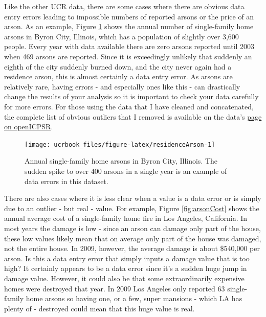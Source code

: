 \documentclass[
  12pt,
  openany]{book}
\begin{document}
Like the other UCR data, there are some cases where there are obvious data entry errors leading to impossible numbers of reported arsons or the price of an arson. As an example, Figure \ref{fig:residenceArson} shows the annual number of single-family home arsons in Byron City, Illinois, which has a population of slightly over 3,600 people. Every year with data available there are zero arsons reported until 2003 when 469 arsons are reported. Since it is exceedingly unlikely that suddenly an eighth of the city suddenly burned down, and the city never again had a residence arson, this is almost certainly a data entry error. As arsons are relatively rare, having errors - and especially ones like this - can drastically change the results of your analysis so it is important to check your data carefully for more errors. For those using the data that I have cleaned and concatenated, the complete list of obvious outliers that I removed is available on the data's \href{https://www.openicpsr.org/openicpsr/project/103540/version/V9/view}{page on openICPSR}.

\begin{figure}

{\centering \texttt{[image: ucrbook\_files/figure-latex/residenceArson-1]} 

}

\caption{Annual single-family home arsons in Byron  City, Illinois. The sudden spike to over 400 arsons in a single year is an example of data errors in this dataset. }\label{fig:residenceArson}
\end{figure}

There are also cases where it is less clear when a value is a data error or is simply due to an outlier - but real - value. For example, Figure \ref{fig:arsonCost} shows the annual average cost of a single-family home fire in Los Angeles, California. In most years the damage is low - since an arson can damage only part of the house, these low values likely mean that on average only part of the house was damaged, not the entire house. In 2009, however, the average damage is about \$540,000 per arson. Is this a data entry error that simply inputs a damage value that is too high? It certainly appears to be a data error since it's a sudden huge jump in damage value. However, it could also be that some extraordinarily expensive homes were destroyed that year. In 2009 Los Angeles only reported 63 single-family home arsons so having one, or a few, super mansions - which LA has plenty of - destroyed could mean that this huge value is real.
\end{document}
